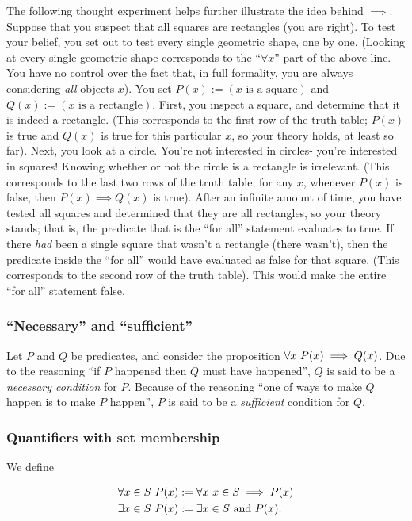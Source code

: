 The following thought experiment helps further illustrate the idea behind $\implies$. Suppose that you suspect that all squares are rectangles (you are right). To test your belief, you set out to test every single geometric shape, one by one. (Looking at every single geometric shape corresponds to the ``$\forall x$'' part of the above line. You have no control over the fact that, in full formality, you are always considering \textit{all} objects $x$). You set $P(x) := (\text{$x$ is a square})$ and $Q(x) := (\text{$x$ is a rectangle})$. First, you inspect a square, and determine that it is indeed a rectangle. (This corresponds to the first row of the truth table; $P(x)$ is true and $Q(x)$ is true for this particular $x$, so your theory holds, at least so far). Next, you look at a circle. You're not interested in circles- you're interested in squares! Knowing whether or not the circle is a rectangle is irrelevant. (This corresponds to the last two rows of the truth table; for any $x$, whenever $P(x)$ is false, then $P(x) \implies Q(x)$ is true). After an infinite amount of time, you have tested all squares and determined that they are all rectangles, so your theory stands; that is, the predicate that is the ``for all'' statement evaluates to true. If there \textit{had} been a single square that wasn't a rectangle (there wasn't), then the predicate inside the ``for all'' would have evaluated as false for that square. (This corresponds to the second row of the truth table). This would make the entire ``for all'' statement false.

\subsubsection{``Necessary'' and ``sufficient''}

Let $P$ and $Q$ be predicates, and consider the proposition $\forall x \text{ } P(x) \implies Q(x)$. Due to the reasoning ``if $P$ happened then $Q$ must have happened'', $Q$ is said to be a \textit{necessary condition} for $P$. Because of the reasoning ``one of ways to make $Q$ happen is to make $P$ happen'', $P$ is said to be a \textit{sufficient} condition for $Q$. 

\subsubsection{Quantifiers with set membership}

We define

\begin{align*}
    &\forall x \in S \text{ } P(x) := \forall x \text{ } x \in S \implies P(x) \\
    &\exists x \in S \text{ } P(x) := \exists x \in S \text{ and } P(x).
\end{align*}

